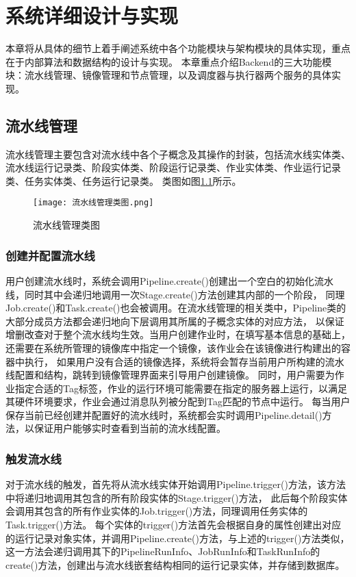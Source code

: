 
\chapter{系统详细设计与实现}
本章将从具体的细节上着手阐述系统中各个功能模块与架构模块的具体实现，重点在于内部算法和数据结构的设计与实现。
本章重点介绍Backend的三大功能模块：流水线管理、镜像管理和节点管理，以及调度器与执行器两个服务的具体实现。

\section{流水线管理}
流水线管理主要包含对流水线中各个子概念及其操作的封装，包括流水线实体类、流水线运行记录类、阶段实体类、阶段运行记录类、作业实体类、作业运行记录类、任务实体类、任务运行记录类。
类图如图\ref{fig:流水线管理类图}所示。
\begin{figure}[h]
  \centering
  \texttt{[image: 流水线管理类图.png]}
  \caption{流水线管理类图}
  \label{fig:流水线管理类图}
\end{figure}

\subsection{创建并配置流水线}

用户创建流水线时，系统会调用Pipeline.create()创建出一个空白的初始化流水线，同时其中会递归地调用一次Stage.create()方法创建其内部的一个阶段，
同理Job.create()和Task.create()也会被调用。在流水线管理的相关类中，Pipeline类的大部分成员方法都会递归地向下层调用其所属的子概念实体的对应方法，
以保证增删改查对于整个流水线均生效。当用户创建作业时，在填写基本信息的基础上，还需要在系统所管理的镜像库中指定一个镜像，该作业会在该镜像进行构建出的容器中执行，
如果用户没有合适的镜像选择，系统将会暂存当前用户所构建的流水线配置和结构，跳转到镜像管理界面来引导用户创建镜像。
同时，用户需要为作业指定合适的Tag标签，作业的运行环境可能需要在指定的服务器上运行，以满足其硬件环境要求，作业会通过消息队列被分配到Tag匹配的节点中运行。
每当用户保存当前已经创建并配置好的流水线时，系统都会实时调用Pipeline.detail()方法，以保证用户能够实时查看到当前的流水线配置。

\subsection{触发流水线}

对于流水线的触发，首先将从流水线实体开始调用Pipeline.trigger()方法，该方法中将递归地调用其包含的所有阶段实体的Stage.trigger()方法，
此后每个阶段实体会调用其包含的所有作业实体的Job.trigger()方法，同理调用任务实体的Task.trigger()方法。
每个实体的trigger()方法首先会根据自身的属性创建出对应的运行记录对象实体，并调用Pipeline.create()方法，与上述的trigger()方法类似，
这一方法会递归调用其下的PipelineRunInfo、JobRunInfo和TaskRunInfo的create()方法，创建出与流水线嵌套结构相同的运行记录实体，并存储到数据库。

